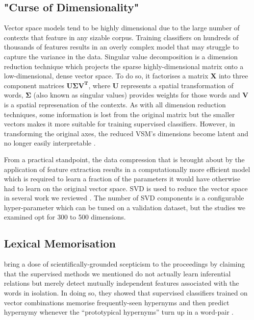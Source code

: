 \subsection{"Curse of Dimensionality"}
Vector space models tend to be highly dimensional due to the large number of contexts that feature in any sizable corpus.  Training classifiers on hundreds of thousands of features results in an overly complex model that may struggle to capture the variance in the data.  Singular value decomposition is a dimension reduction technique which projects the sparse highly-dimensional matrix onto a low-dimensional, dense vector space.  To do so, it factorises a matrix $\bm{X}$ into three component matrices $\bm{U}\bm{\Sigma}\bm{V^T}$, where $\bm{U}$ represents a spatial transformation of words, $\bm{\Sigma}$ (also known as singular values) provides weights for those words and $\bm{V}$ is a spatial represenation of the contexts.  As with all dimension reduction techniques, some information is lost from the original matrix but the smaller vectors makes it more suitable for training supervised classifiers.  However, in transforming the original axes, the reduced \ac{VSM}’s dimensions become latent and no longer easily interpretable \citep{levy2015supervised}.

From a practical standpoint, the data compression that is brought about by the application of feature extraction results in a computationally more efficient model which is required to learn a fraction of the parameters it would have otherwise had to learn on the original vector space.  \ac{SVD} is used to reduce the vector space in several work we reviewed \citep{baroni2012entailment, roller2014inclusive, levy2015supervised}.  The number of \ac{SVD} components is a configurable hyper-parameter which can be tuned on a validation dataset, but the studies we examined opt for 300 to 500 dimensions.

\subsection{Lexical Memorisation}
\citeauthor{levy2015supervised} bring a dose of scientifically-grounded scepticism to the proceedings by claiming that the supervised methods we mentioned do not actually learn inferential relations but merely detect mutually independent features associated with the words in isolation.  In doing so, they showed that supervised classifiers trained on vector combinations memorise frequently-seen hypernyms and then predict hypernymy whenever the “prototypical hypernyms” turn up in a word-pair \citep{levy2015supervised}.

